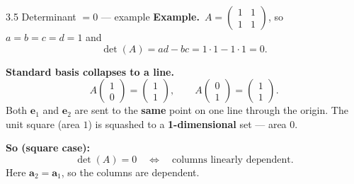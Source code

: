 \documentclass[11pt,aspectratio=169]{beamer}
\begin{document}
\begin{frame}{3.5 Determinant $=0$ --- example}
  \footnotesize
  \textbf{Example.}\
  $A=\begin{pmatrix}1&1\\ 1&1\end{pmatrix}$, so $a=b=c=d=1$ and
  \[
    \det(A)=ad-bc=1\cdot 1-1\cdot 1=0.
  \]

  \medskip
  \textbf{Standard basis collapses to a line.}\
  \[
    A\begin{pmatrix}1\\ 0\end{pmatrix}=\begin{pmatrix}1\\ 1\end{pmatrix},
    \qquad
    A\begin{pmatrix}0\\ 1\end{pmatrix}=\begin{pmatrix}1\\ 1\end{pmatrix}.
  \]
  Both $\mathbf{e}_1$ and $\mathbf{e}_2$ are sent to the \textbf{same} point on one line through
  the origin. The unit square (area $1$) is squashed to a \textbf{1-dimensional} set --- area $0$.

  \medskip
  \textbf{So (square case):}\
  \[
    \det(A)=0
    \quad\Longleftrightarrow\quad
    \text{columns linearly dependent}.
  \]
  Here $\mathbf{a}_2=\mathbf{a}_1$, so the columns are dependent.
\end{frame}
\end{document}
